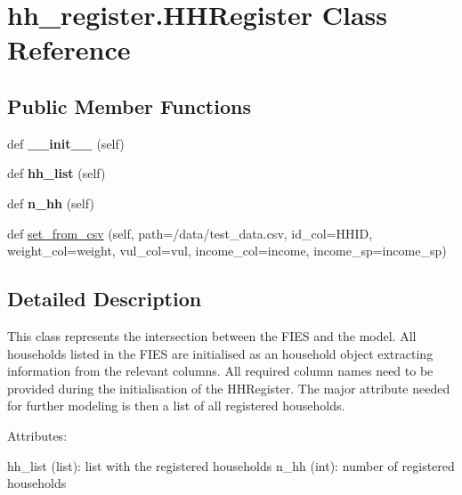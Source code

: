 \hypertarget{classhh__register_1_1HHRegister}{}\section{hh\+\_\+register.\+H\+H\+Register Class Reference}
\label{classhh__register_1_1HHRegister}
\subsection*{Public Member Functions}
\begin{DoxyCompactItemize}
\item 
\mbox{\label{classhh__register_1_1HHRegister_a347ae8c093b6e38837d200afb8ca5275}} 
def {\bfseries \+\_\+\+\_\+init\+\_\+\+\_\+} (self)
\item 
\mbox{\label{classhh__register_1_1HHRegister_a2b0a16d9c29fbfd0e083f584ee2190fa}} 
def {\bfseries hh\+\_\+list} (self)
\item 
\mbox{\label{classhh__register_1_1HHRegister_a53962d9da6041c5613ff84a6ceb11704}} 
def {\bfseries n\+\_\+hh} (self)
\item 
def \hyperlink{classhh__register_1_1HHRegister_ac4f13033280159722bcfbac281973465}{set\+\_\+from\+\_\+csv} (self, path=\textquotesingle{}/data/test\+\_\+data.\+csv\textquotesingle{}, id\+\_\+col=\textquotesingle{}H\+H\+ID\textquotesingle{}, weight\+\_\+col=\textquotesingle{}weight\textquotesingle{}, vul\+\_\+col=\textquotesingle{}vul\textquotesingle{}, income\+\_\+col=\textquotesingle{}income\textquotesingle{}, income\+\_\+sp=\textquotesingle{}income\+\_\+sp\textquotesingle{})
\end{DoxyCompactItemize}


\subsection{Detailed Description}
\begin{DoxyVerb}This class represents the intersection between the FIES and the model. All households
   listed in the FIES are initialised as an household object extracting information from the
   relevant columns. All required column names need to be provided during the initialisation
   of the HHRegister. The major attribute needed for further modeling is then a list of all
   registered households.

   Attributes:

       hh_list (list): list with the registered households
       n_hh (int): number of registered households
\end{DoxyVerb}
 

